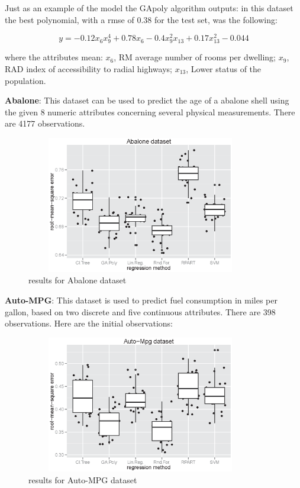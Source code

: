 \documentclass[a4paper, 12pt]{article}
\begin{document}
Just as an example of the model the GApoly algorithm outputs: in this dataset the best polynomial, with a rmse of 0.38 for the test set, was the following:

$$y = -0.12 x_6 x_9^4 + 0.78 x_6 - 0.4 x_9^2 x_{13} + 0.17 x_{13}^2 - 0.044$$

where the attributes mean:
$x_6$, RM average number of rooms per dwelling;
$x_9$, RAD index of accessibility to radial highways;
$x_{13}$, Lower status of the population.

\textbf{Abalone}: This dataset can be used to predict the age of a abalone shell using the given 8 numeric attributes concerning several physical measurements. There are 4177 observations.

\begin{figure}[htb]
	\begin{center}
		\includegraphics[height=6cm,width=10cm,angle=0]
			{figures/Abalone_dataset_lambda0.8_25runs.eps}
		\caption{results for Abalone dataset}
	\end{center}
\end{figure}


\textbf{Auto-MPG}: This dataset is used to predict fuel consumption in miles per gallon, based on two discrete and five continuous attributes. There are 398 observations. Here are the initial observations:

\begin{figure}[htb]
	\begin{center}
		\includegraphics[height=6cm,width=10cm,angle=0]
			{figures/Auto-Mpg_dataset_lambda0.8_25runs.eps}
		\caption{results for Auto-MPG dataset}
	\end{center}
\end{figure}
\end{document}
